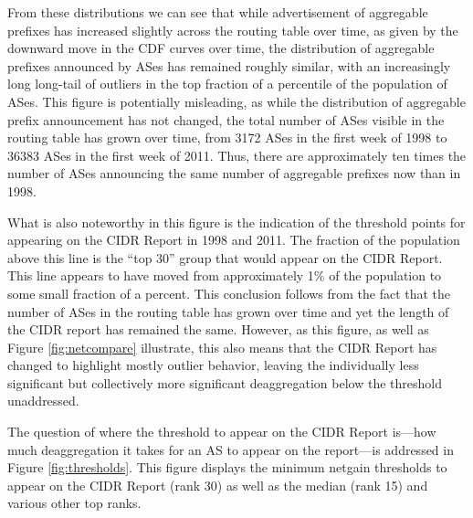 From these distributions we can see that while advertisement of aggregable
prefixes has increased slightly across the routing table over time, as given by
the downward move in the CDF curves over time, the distribution of aggregable
prefixes announced by ASes has remained roughly similar, with an increasingly
long long-tail of outliers in the top fraction of a percentile of the
population of ASes. This figure is potentially misleading, as while the
distribution of aggregable prefix announcement has not changed, the total
number of ASes visible in the routing table has grown over time, from 3172 ASes
in the first week of 1998 to 36383 ASes in the first week of 2011. Thus, there
are approximately ten times the number of ASes announcing the same number of
aggregable prefixes now than in 1998.

What is also noteworthy in this figure is the indication of
the threshold points for appearing on the CIDR Report in 1998 and 2011. The
fraction of the population above this line is the ``top 30'' group that would
appear on the CIDR Report. This line appears to have moved from approximately
1\% of the population to some small fraction of a percent. This conclusion
follows from the fact that the number of ASes in the routing table has grown
over time and yet the length of the CIDR report has remained the same. However,
as this figure, as well as Figure \ref{fig:netcompare} illustrate, this also
means that the CIDR Report has changed to highlight mostly outlier behavior,
leaving the individually less significant but collectively more significant
deaggregation below the threshold unaddressed.


The question of where the threshold to appear on the CIDR Report is---how much
deaggregation it takes for an AS to appear on the report---is addressed in
Figure \ref{fig:thresholds}. This figure displays the minimum netgain
thresholds to appear on the CIDR Report (rank 30) as well as the median (rank
15) and various other top ranks.

